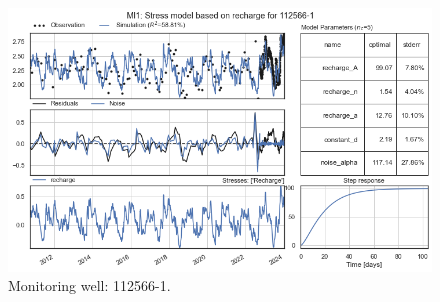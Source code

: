 \begin{figure}[htbp]
    \begin{minipage}{0.32\textwidth}
        \centering
        \includegraphics[width=\linewidth]{frontmatter/Rozenburg-fig/3.png}
        \caption{Monitoring well: 112566-1.}
        \label{fig:112565-3}
    \end{minipage}
\end{figure}

